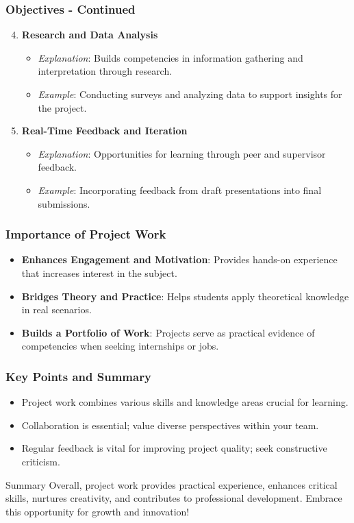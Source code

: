 \documentclass[aspectratio=169]{beamer}
\begin{document}
\begin{frame}[fragile]
    \frametitle{Objectives - Continued}
    \begin{enumerate}
        \setcounter{enumi}{3}
        \item 
        \textbf{Research and Data Analysis}
        \begin{itemize}
            \item \textit{Explanation}: Builds competencies in information gathering and interpretation through research.
            \item \textit{Example}: Conducting surveys and analyzing data to support insights for the project.
        \end{itemize}

        \item 
        \textbf{Real-Time Feedback and Iteration}
        \begin{itemize}
            \item \textit{Explanation}: Opportunities for learning through peer and supervisor feedback.
            \item \textit{Example}: Incorporating feedback from draft presentations into final submissions.
        \end{itemize}
    \end{enumerate}
\end{frame}

\begin{frame}[fragile]
    \frametitle{Importance of Project Work}
    \begin{itemize}
        \item \textbf{Enhances Engagement and Motivation}: Provides hands-on experience that increases interest in the subject.
        \item \textbf{Bridges Theory and Practice}: Helps students apply theoretical knowledge in real scenarios.
        \item \textbf{Builds a Portfolio of Work}: Projects serve as practical evidence of competencies when seeking internships or jobs.
    \end{itemize}
\end{frame}

\begin{frame}[fragile]
    \frametitle{Key Points and Summary}
    \begin{itemize}
        \item Project work combines various skills and knowledge areas crucial for learning.
        \item Collaboration is essential; value diverse perspectives within your team.
        \item Regular feedback is vital for improving project quality; seek constructive criticism.
    \end{itemize}
    \begin{block}{Summary}
        Overall, project work provides practical experience, enhances critical skills, nurtures creativity, and contributes to professional development. Embrace this opportunity for growth and innovation!
    \end{block}
\end{frame}
\end{document}
